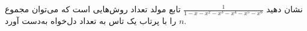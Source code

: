 \EXERCISE
نشان دهید
$\frac{1}{1-x-x^2-x^3-x^4-x^5-x^6}$
تابع مولد تعداد روش‌هایی است که می‌توان مجموع
$n$
را با پرتاب یک تاس به تعداد دل‌خواه به‌دست آورد.